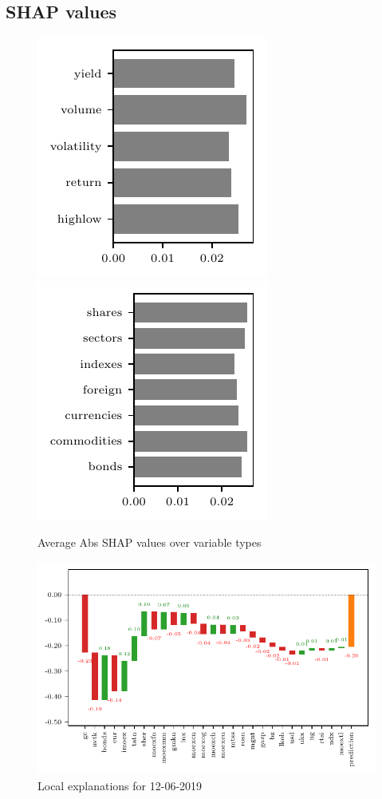 \documentclass[review, authoryear]{elsarticle}
\begin{document}
\clearpage
\subsection{SHAP values}

\begin{figure}[h]
    \centering
    \includegraphics{types.pdf}
    \includegraphics{classes.pdf}
    \caption{Average Abs SHAP values over variable types}
    \label{fig:types}
\end{figure}

\begin{figure}[h]
	\centering
	\includegraphics{local.pdf}
	\caption{Local explanations for 12-06-2019}
	\label{fig:local}
\end{figure}
\end{document}
